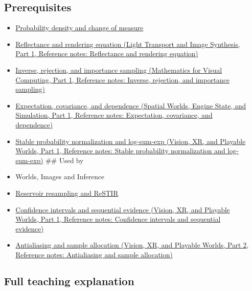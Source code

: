 \subsection{Prerequisites}\label{appendix-031e02bf28af-prerequisites}

\hypertarget{appendix-031e02bf28af-prerequisites}{}

\begin{itemize}
\item
  \hyperref[appendix-4815cd87ab8b]{Probability density and change of measure}
\item
  \href{../04-Light-Transport-and-Image-Synthesis-P01/main.pdf\#appendix-96da0b153b77}{Reflectance and rendering equation (Light Transport and Image Synthesis, Part 1, Reference notes: Reflectance and rendering equation)}
\item
  \href{../02-Mathematics-for-Visual-Computing-P01/main.pdf\#appendix-8d863ed954d0}{Inverse, rejection, and importance sampling (Mathematics for Visual Computing, Part 1, Reference notes: Inverse, rejection, and importance sampling)}
\item
  \href{../05-Spatial-Worlds-Engine-State-and-Simulation-P01/main.pdf\#appendix-54c383df9992}{Expectation, covariance, and dependence (Spatial Worlds, Engine State, and Simulation, Part 1, Reference notes: Expectation, covariance, and dependence)}
\item
  \href{../07-Vision-XR-and-Playable-Worlds-P01/main.pdf\#appendix-d580b422240f}{Stable probability normalization and log-sum-exp (Vision, XR, and Playable Worlds, Part 1, Reference notes: Stable probability normalization and log-sum-exp)} \#\# Used by
\item
  {Worlds, Images and Inference}
\item
  \hyperref[appendix-68be451b78b1]{Reservoir resampling and ReSTIR}
\item
  \href{../07-Vision-XR-and-Playable-Worlds-P01/main.pdf\#appendix-c83016554b1e}{Confidence intervals and sequential evidence (Vision, XR, and Playable Worlds, Part 1, Reference notes: Confidence intervals and sequential evidence)}
\item
  \href{../07-Vision-XR-and-Playable-Worlds-P02/main.pdf\#appendix-4192b2bdd21e}{Antialiasing and sample allocation (Vision, XR, and Playable Worlds, Part 2, Reference notes: Antialiasing and sample allocation)}
\end{itemize}

\subsection{Full teaching explanation}\label{appendix-031e02bf28af-full-teaching-explanation}

